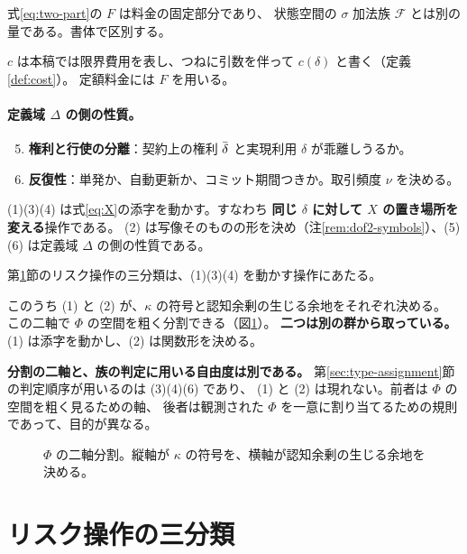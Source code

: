 \begin{remark}
\label{rem:dof2-symbols}
式\eqref{eq:two-part}の $F$ は料金の固定部分であり、
状態空間の $\sigma$ 加法族 $\mathcal{F}$ とは別の量である。書体で区別する。

$c$ は本稿では限界費用を表し、つねに引数を伴って $c(\delta)$ と書く（定義\ref{def:cost}）。
定額料金には $F$ を用いる。
\end{remark}

\paragraph{定義域 \texorpdfstring{$\Delta$}{Δ} の側の性質。}
\begin{enumerate}[label=(\arabic*)]
\setcounter{enumi}{4}
\item \textbf{権利と行使の分離}：契約上の権利 $\dbar$ と実現利用 $\delta$ が乖離しうるか。
\item \textbf{反復性}：単発か、自動更新か、コミット期間つきか。取引頻度 $\nu$ を決める。
\end{enumerate}

\begin{remark}[三群の区別]
\label{rem:dof-groups}
(1)(3)(4) は式\eqref{eq:X}の添字を動かす。すなわち
\textbf{同じ $\delta$ に対して $X$ の置き場所を変える}操作である。
(2) は写像そのものの形を決め（注\ref{rem:dof2-symbols}）、(5)(6) は定義域 $\Delta$ の側の性質である。

第\ref{sec:three-ops}節のリスク操作の三分類は、(1)(3)(4) を動かす操作にあたる。
\end{remark}

このうち (1) と (2) が、$\kappa$ の符号と認知余剰の生じる余地をそれぞれ決める。
この二軸で $\Phi$ の空間を粗く分割できる（図\ref{fig:quadrant}）。
\textbf{二つは別の群から取っている。} (1) は添字を動かし、(2) は関数形を決める。

\textbf{分割の二軸と、族の判定に用いる自由度は別である。}
第\ref{sec:type-assignment}節の判定順序が用いるのは (3)(4)(6) であり、
(1) と (2) は現れない。前者は $\Phi$ の空間を粗く見るための軸、
後者は観測された $\Phi$ を一意に割り当てるための規則であって、目的が異なる。

\begin{figure}[htbp]
\centering
{}
\caption{$\Phi$ の二軸分割。縦軸が $\kappa$ の符号を、横軸が認知余剰の生じる余地を決める。}
\label{fig:quadrant}
\end{figure}

\section{リスク操作の三分類}
\label{sec:three-ops}

